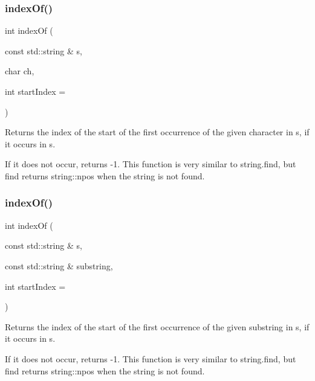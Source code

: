 \subsubsection{\texorpdfstring{index\+Of()}{indexOf()}\hspace{0.1cm}{\footnotesize\ttfamily [1/2]}}
{\footnotesize\ttfamily int index\+Of (\begin{DoxyParamCaption}\item[{const std\+::string \&}]{s,  }\item[{char}]{ch,  }\item[{int}]{start\+Index = {} }\end{DoxyParamCaption})}



Returns the index of the start of the first occurrence of the given character in s, if it occurs in s. 

If it does not occur, returns -\/1. This function is very similar to string.\+find, but find returns string\+::npos when the string is not found. \mbox{\label{namespacesgl_1_1priv_1_1strlib_afb99d6e0fd373a67f029ad67cf9c46db}} 
\subsubsection{\texorpdfstring{index\+Of()}{indexOf()}\hspace{0.1cm}{\footnotesize\ttfamily [2/2]}}
{\footnotesize\ttfamily int index\+Of (\begin{DoxyParamCaption}\item[{const std\+::string \&}]{s,  }\item[{const std\+::string \&}]{substring,  }\item[{int}]{start\+Index = {} }\end{DoxyParamCaption})}



Returns the index of the start of the first occurrence of the given substring in s, if it occurs in s. 

If it does not occur, returns -\/1. This function is very similar to string.\+find, but find returns string\+::npos when the string is not found. \mbox{\label{namespacesgl_1_1priv_1_1strlib_adf319817276df06d9df8124ebdb354b1}} 

